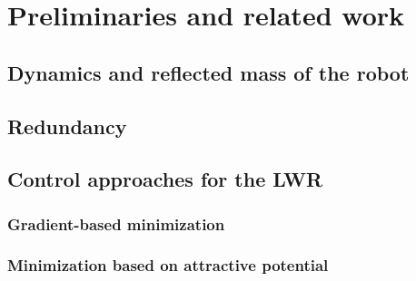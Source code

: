 \chapter{Preliminaries and related work}

\section{Dynamics and reflected mass of the robot}

\section{Redundancy}

\section{Control approaches for the LWR}
\subsection{Gradient-based minimization}
\subsection{Minimization based on attractive potential}